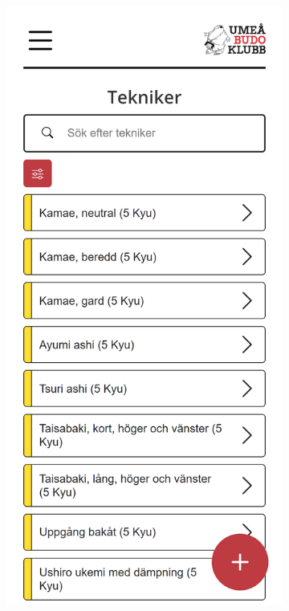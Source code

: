 \documentclass{article}
\begin{document}
{\begin{figure}[h]
{\begin{subfigure}[b]{0.25\textwidth}
                     \includegraphics[width=\textwidth]{images/Screens/Technique.png}

\end{subfigure}}
\end{figure}}
\end{document}
